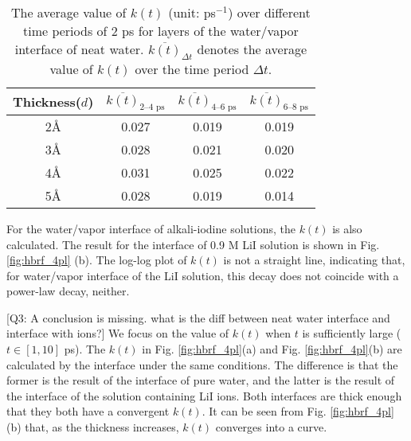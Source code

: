 %
\begin{table}[htbp]
\centering
\caption{\label{tab:hbrf_neat} 
   {\color{blue}The average value of $k(t)$ (unit: ps$^{-1}$) over different time periods of 2 ps for layers of the water/vapor interface of neat water.  
   $\overline{k(t)}_{\Delta t}$ denotes the average value of $k(t)$ over the time period $\Delta t$.} }
\begin{tabular}{cccc}
  Thickness($d$) & $\overline{k(t)}_{\text{2--4 ps}}$ & $\overline{k(t)}_{\text{4--6 ps}}$ & $\overline{k(t)}_{\text{6--8 ps}}$\\
\hline
  2\AA & 0.027 & 0.019 & 0.019\\
  3\AA & 0.028 & 0.021 & 0.020 \\
  4\AA & 0.031 & 0.025 & 0.022 \\
  5\AA & 0.028 & 0.019 & 0.014 
\end{tabular}
\end{table}
%
For the water/vapor interface of alkali-iodine solutions, the $k(t)$ is also calculated.  The result for the interface of 0.9 M LiI solution is shown in Fig.\thinspace\ref{fig:hbrf_4pl} (b). The log-log plot of $k(t)$ is not a straight line, indicating that, for water/vapor interface of the LiI solution, this decay does not coincide with a power-law decay, neither.

{\color{red}[Q3: A conclusion is missing. what is the diff between neat water interface and interface with ions?]}
{\color{blue} We focus on the value of $k(t)$ when $t$ is sufficiently large ($t \in [1, 10]$ ps). 
The $k(t)$ in Fig. \ref{fig:hbrf_4pl}(a) and Fig. \ref{fig:hbrf_4pl}(b) are calculated by the interface 
under the same conditions. The difference is that the former is the result of the interface of pure water,
and the latter is the result of the interface of the solution containing LiI ions. 
Both interfaces are thick enough that they both have a convergent $k(t)$. 
It can be seen from Fig. \ref{fig:hbrf_4pl} (b) that, as the thickness increases, $k(t)$ converges into a curve.}

